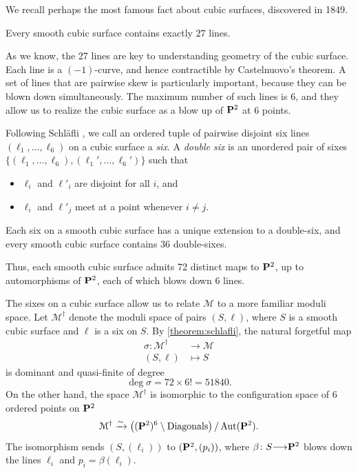 \documentclass[12pt,reqno]{amsart}
\renewcommand{\to}{{\longrightarrow}}
\numberwithin{equation}{section}
\begin{document}
We recall perhaps the most famous fact about cubic surfaces, discovered in 1849. 
\begin{theorem}
  \label{theorem:cayleysalmon}
  Every smooth cubic surface contains exactly $27$ lines.
\end{theorem}
As we know, the 27 lines are key to understanding geometry of the
cubic surface.  Each line is a $(-1)$-curve, and hence contractible by
Castelnuovo's theorem.  A set of lines that are pairwise skew is
particularly important, because they can be blown down simultaneously.
The maximum number of such lines is 6, and they allow us to realize
the cubic surface as a blow up of $\P^2$ at 6 points.

Following Schl\"afli \cite{sch:58}, we call an ordered tuple of pairwise disjoint six lines $(\ell_1, \dots, \ell_6)$ on a cubic surface a \emph{six}.
A \emph{double six} is an unordered pair of sixes $\{(\ell_1, \dots, \ell_6), (\ell_1', \dots, \ell_6')\}$ such that
\begin{itemize}
\item $\ell_{i}$ and $\ell'_{i}$ are disjoint for all $i$, and
\item $\ell_{i}$ and $\ell'_{j}$ meet at a point whenever $i \neq j$.
\end{itemize}

\begin{theorem}
  \label{theorem:schlafli} Each six on a smooth cubic surface has a unique extension to a double-six, and every smooth cubic surface contains $36$ double-sixes.
\end{theorem}
Thus, each smooth cubic surface admits 72 distinct maps to
$\P^2$, up to automorphisms of $\P^2$, each of which
blows down 6 lines.

The sixes on a cubic surface allow us to relate $\mathcal M$ to a more
familiar moduli space.  Let $\mathcal M^\dagger$ denote the moduli
space of pairs $(S, \ell)$, where $S$ is a smooth cubic surface and
$\ell$ is a six on $S$.  By \autoref{theorem:schlafli}, the natural
forgetful map
\begin{align*}
  \sigma \colon \mathcal M^\dagger &\to \mathcal M \\
  (S, \ell) &\mapsto S
\end{align*}
is dominant and quasi-finite of degree
\[ \deg \sigma = 72 \times 6! = 51840.\] On the other hand, the space
$\mathcal M^\dagger$ is isomorphic to the configuration space of 6
ordered points on $\P^2$
\[ \mathcal M^\dagger \xrightarrow{\sim} \left( (\P^2)^6 \setminus
    \text{Diagonals} \right) / \Aut(\P^2).\] The isomorphism sends
$(S, (\ell_i))$ to $(\P^2, (p_i))$, where $\beta \colon S \to \P^2$
blows down the lines $\ell_i$ and $p_i = \beta(\ell_i)$.
\end{document}
